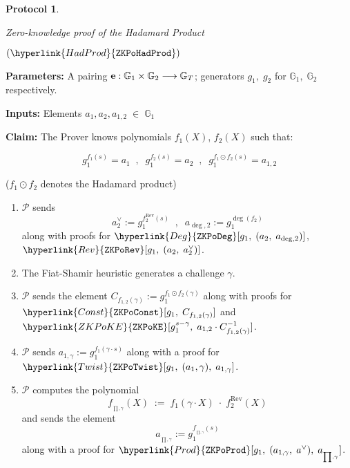 \documentclass[11pt, lettersize, notitlepage, leqno, footskip=0.6cm]{article}
\newcommand{\lra}{\longrightarrow}
\newcommand{\mc}{\mathcal}
\newcommand{\mb}{\mathbb}
\newcommand{\mr}{\mathrm}
\newcommand{\mP}{\mc{P}}
\newcommand{\vs}{\vspace{-0.15cm}}
\newcommand{\noin}{\noindent}
\newtheorem{Prot}[Thm]{Protocol}
\numberwithin{equation}{section}
\begin{document}
\begin{mdframed}
\begin{Prot} \hypertarget{HadProd}{Zero-knowledge proof of the Hadamard Product} $(\hyperlink{HadProd}{\tt{ZKPoHadProd}})$\end{Prot}  

\noindent \textbf{Parameters:} A pairing ${\bf{e}}:\mb{G}_1\times \mb{G}_2\lra \mb{G}_T$; generators $g_1,\;g_2$ for $\mb{G}_1,\; \mb{G}_2$ respectively.


\noindent \textbf{Inputs:} Elements $a_1, a_2, a_{1,2} \;\in\; \mb{G}_1$

\noindent \textbf{Claim:} The Prover knows polynomials $f_1(X)$, $f_2(X)$ such that:

\vs $$g_1^{f_1(s)} = a_1\;\;,\;\;g_1^{f_2(s)} = a_2 \;\;,\;\; g_1^{f_1\odot f_2(s)} = a_{1,2}$$

\noin ($f_1\odot f_2$ denotes the Hadamard product)



\begin{enumerate}[wide, labelwidth=!, labelindent=0pt] 

\item $\mP$ sends \vs $$a_2^{\vee}:= g_1^{f_2^{\mr{Rev}}(s)} \;\;,\;\;a_{\deg, 2}:= g_1^{\deg(f_2)}  $$ along with proofs for $\hyperlink{Deg}{\tt{ZKPoDeg}}[g_1,\;(a_2, \;a_{\deg,2})]$, $\hyperlink{Rev}{\tt{ZKPoRev}}[g_1,\;(a_2,\;a_2^{\vee})]$.

\item The Fiat-Shamir heuristic generates a challenge $\gamma$.

\item $\mP$ sends the element $C_{f_{1,2}(\gamma)}:= g_1^{f_{1}\odot f_{2}(\gamma)}$ along with proofs for $\hyperlink{Const}{\tt{ZKPoConst}}[g_1,\;C_{f_{1,2}(\gamma)}]$ and $\hyperlink{ZKPoKE}{\tt{ZKPoKE}}[g_1^{s-\gamma},\; a_{1,2}\cdot C_{f_{1,2}(\gamma)}^{-1}]$.

\item $\mP$ sends $a_{1,\gamma}:= g_1^{f_1(\gamma\cdot  s)}$ along with a proof for $\hyperlink{Twist}{\tt{ZKPoTwist}}[g_1,\;(a_1,\gamma),\;a_{1,\gamma}]$.


\item $\mP$ computes the polynomial \vs $$f _{_{\prod , \gamma}}(X)\;:=\; f_1(\gamma \cdot X)\;\cdot\; f_2^{\mr{Rev}}(X)  $$ and sends the element \vs $$ a_{_{\prod , \gamma}}:= g_1^{f _{_{\prod , \gamma}}(s)}  $$ along with a proof for $\hyperlink{Prod}{\tt{ZKPoProd}}[g_1,\;(a_{1,\gamma}, \;a^{\vee}),\; a_{_{\prod , \gamma}}]$.


\end{enumerate}
\end{mdframed}
\end{document}
